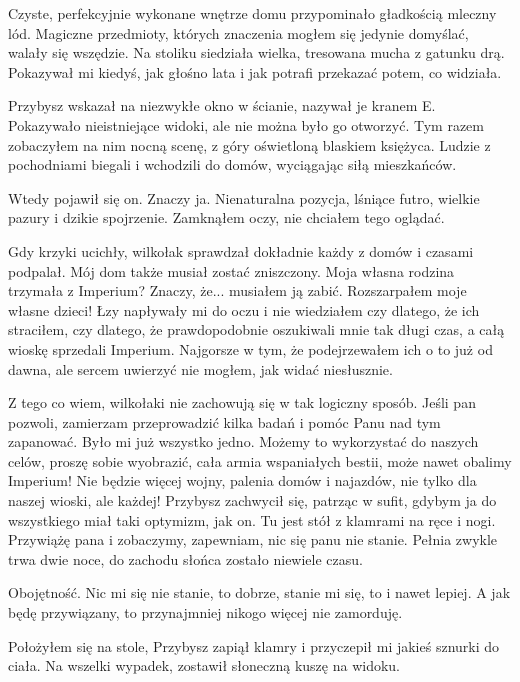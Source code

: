 Czyste, perfekcyjnie wykonane wnętrze domu przypominało gładkością mleczny lód.
Magiczne przedmioty, których znaczenia mogłem się jedynie domyślać, walały się wszędzie.
Na stoliku siedziała wielka, tresowana mucha z gatunku drą. Pokazywał mi kiedyś, jak głośno lata i jak potrafi przekazać potem, co widziała.

Przybysz wskazał na niezwykłe okno w ścianie, nazywał je kranem E.
Pokazywało nieistniejące widoki, ale nie można było go otworzyć.
Tym razem zobaczyłem na nim nocną scenę, z góry oświetloną blaskiem księżyca. 
Ludzie z pochodniami biegali i wchodzili do domów, wyciągając siłą mieszkańców.

Wtedy pojawił się on. Znaczy ja.
Nienaturalna pozycja, lśniące futro, wielkie pazury i dzikie spojrzenie.
Zamknąłem oczy, nie chciałem tego oglądać.

Gdy krzyki ucichły, wilkołak sprawdzał dokładnie każdy z domów i czasami podpalał.
Mój dom także musiał zostać zniszczony. Moja własna rodzina trzymała z Imperium? 
Znaczy, że... musiałem ją zabić. Rozszarpałem moje własne dzieci!
Łzy napływały mi do oczu i nie wiedziałem czy dlatego, że ich straciłem, czy dlatego, że prawdopodobnie oszukiwali mnie tak długi czas, a całą wioskę sprzedali Imperium.
Najgorsze w tym, że podejrzewałem ich o to już od dawna, ale sercem uwierzyć nie mogłem, jak widać niesłusznie.

\begin{dialogue}
\ds{} Z tego co wiem, wilkołaki nie zachowują się w tak logiczny sposób.
Jeśli pan pozwoli, zamierzam przeprowadzić kilka badań i pomóc Panu nad tym zapanować.
\dm{} Było mi już wszystko jedno.
\dm{} Możemy to wykorzystać do naszych celów, proszę sobie wyobrazić, cała armia wspaniałych bestii, może nawet obalimy Imperium!
Nie będzie więcej wojny, palenia domów i najazdów, nie tylko dla naszej wioski, ale każdej! \dm{} 
Przybysz zachwycił się, patrząc w sufit, gdybym ja do wszystkiego miał taki optymizm, jak on.
\dm{} Tu jest stół z klamrami na ręce i nogi.
Przywiążę pana i zobaczymy, zapewniam, nic się panu nie stanie.
Pełnia zwykle trwa dwie noce, do zachodu słońca zostało niewiele czasu.
\end{dialogue}

Obojętność.
Nic mi się nie stanie, to dobrze, stanie mi się, to i nawet lepiej.
A jak będę przywiązany, to przynajmniej nikogo więcej nie zamorduję.

Położyłem się na stole, Przybysz zapiął klamry i przyczepił mi jakieś sznurki do ciała.
Na wszelki wypadek, zostawił słoneczną kuszę na widoku.

